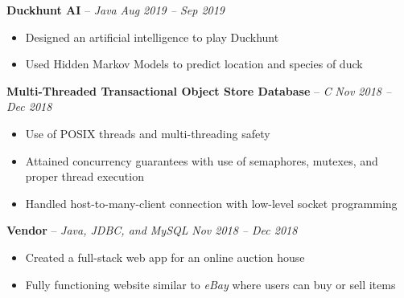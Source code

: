 \documentclass[10pt,letterpaper]{article}
\begin{document}
\spacedhrule{0.3em}{-0.5em} 










\headedsection 
{\textbf{Duckhunt AI} -- \textit{Java}}
{\textit{Aug 2019 -- Sep 2019}} {
	\begin{itemize}[noitemsep,nolistsep]
		\item Designed an artificial intelligence to play Duckhunt
		\item Used Hidden Markov Models to predict location and species of duck
	\end{itemize}
}
				


\headedsection 
{\textbf{Multi-Threaded Transactional Object Store Database} -- \textit{C}}
{\textit{Nov 2018 -- Dec 2018}} {
	\begin{itemize}[noitemsep,nolistsep]
		\item Use of POSIX threads and multi-threading safety
		\item Attained concurrency guarantees with use of semaphores, mutexes, and proper thread execution
		\item Handled host-to-many-client connection with low-level socket programming
	\end{itemize}
}
				
										
\headedsection 
{\textbf{Vendor} -- \textit{Java, JDBC, and MySQL}}
{\textit{Nov 2018 -- Dec 2018}} {
	\begin{itemize}[noitemsep,nolistsep]
		\item Created a full-stack web app for an online auction house
		\item Fully functioning website similar to \textit{eBay} where users can buy or sell items
	\end{itemize}
}
\end{document}
